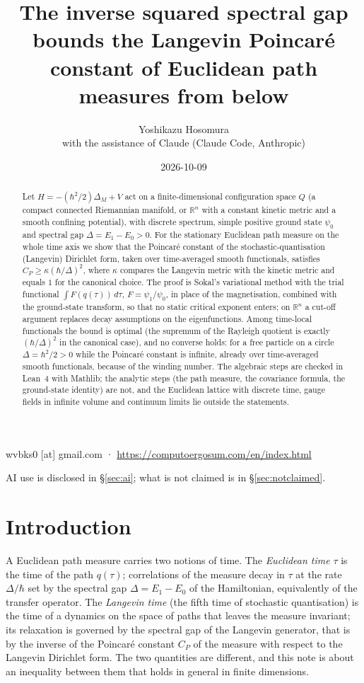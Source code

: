 \documentclass[11pt,a4paper]{article}
\title{The inverse squared spectral gap bounds the Langevin Poincar\'e constant of Euclidean path measures from below}
\author{Yoshikazu Hosomura\\[.3em]\normalsize with the assistance of Claude (Claude Code, Anthropic)}
\date{2026-10-09}
\theoremstyle{definition}
\theoremstyle{remark}
\newcommand{\R}{\mathbb{R}}
\begin{document}
\maketitle
\begin{center}\small wvbks0 [at] gmail.com · \url{https://computoergosum.com/en/index.html}\end{center}
\begin{center}\small AI use is disclosed in \S\ref{sec:ai}; what is not claimed is in \S\ref{sec:notclaimed}.\end{center}

\begin{abstract}
Let $H=-(\hbar^2/2)\Delta_M+V$ act on a finite-dimensional configuration space $Q$ (a compact connected Riemannian manifold, or $\R^n$ with a constant kinetic metric and a smooth confining potential), with discrete spectrum, simple positive ground state $\psi_0$ and spectral gap $\Delta=E_1-E_0>0$.
For the stationary Euclidean path measure on the whole time axis we show that the Poincar\'e constant of the stochastic-quantisation (Langevin) Dirichlet form, taken over time-averaged smooth functionals, satisfies $C_P\ge\kappa(\hbar/\Delta)^2$, where $\kappa$ compares the Langevin metric with the kinetic metric and equals $1$ for the canonical choice.
The proof is Sokal's variational method with the trial functional $\int F(q(\tau))\,d\tau$, $F=\psi_1/\psi_0$, in place of the magnetisation, combined with the ground-state transform, so that no static critical exponent enters; on $\R^n$ a cut-off argument replaces decay assumptions on the eigenfunctions.
Among time-local functionals the bound is optimal (the supremum of the Rayleigh quotient is exactly $(\hbar/\Delta)^2$ in the canonical case), and no converse holds: for a free particle on a circle $\Delta=\hbar^2/2>0$ while the Poincar\'e constant is infinite, already over time-averaged smooth functionals, because of the winding number.
The algebraic steps are checked in Lean~4 with Mathlib; the analytic steps (the path measure, the covariance formula, the ground-state identity) are not, and the Euclidean lattice with discrete time, gauge fields in infinite volume and continuum limits lie outside the statements.
\end{abstract}

\section{Introduction}\label{sec:intro}

A Euclidean path measure carries two notions of time.
The \emph{Euclidean time} $\tau$ is the time of the path $q(\tau)$; correlations of the measure decay in $\tau$ at the rate $\Delta/\hbar$ set by the spectral gap $\Delta=E_1-E_0$ of the Hamiltonian, equivalently of the transfer operator.
The \emph{Langevin time} (the fifth time of stochastic quantisation) is the time of a dynamics on the space of paths that leaves the measure invariant; its relaxation is governed by the spectral gap of the Langevin generator, that is by the inverse of the Poincar\'e constant $C_P$ of the measure with respect to the Langevin Dirichlet form.
The two quantities are different, and this note is about an inequality between them that holds in general in finite dimensions.
\end{document}
